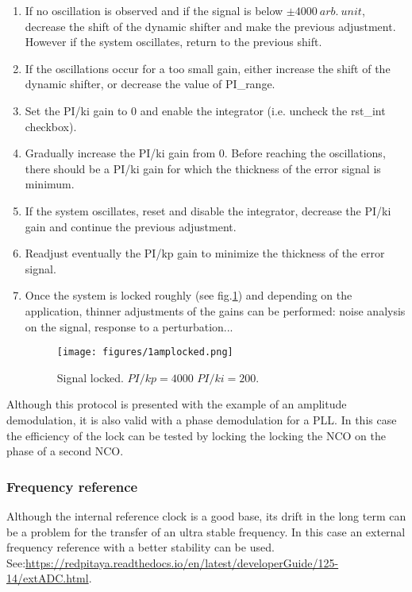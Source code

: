 \documentclass[12pt,oneside]{article}
\begin{document}
\begin{enumerate}
	\item If no oscillation is observed and if the signal is below $\pm 4000~arb.~unit$, decrease the shift of the dynamic shifter and make the previous adjustment. However if the system oscillates, return to the previous shift.
	\item If the oscillations occur for a too small gain, either increase the shift of the dynamic shifter, or decrease the value of PI\_range.
	\item Set the PI/ki gain to $0$ and enable the integrator (i.e. uncheck the rst\_int checkbox).
	\item Gradually increase the PI/ki gain from $0$. Before reaching the oscillations, there should be a PI/ki gain for which the thickness of the error signal is minimum. 
	\item If the system oscillates, reset and disable the integrator, decrease the PI/ki gain and continue the previous adjustment. 
	\item Readjust eventually the PI/kp gain to minimize the thickness of the error signal.
	\item Once the system is locked roughly (see fig.\ref{fig:3ampdemod.png}) and depending on the application, thinner adjustments of the gains can be performed: noise analysis on the signal, response to a perturbation... 
	
\begin{figure}[h!tb]
	\begin{center}
		\vspace{0.5cm}
		\texttt{[image: figures/1amplocked.png]}
		\caption{Signal locked. $PI/kp=4000$ $PI/ki=200$.}
		\label{fig:3ampdemod.png}
	\end{center}
\end{figure}
	
\end{enumerate}
\vspace{0.3cm}

Although this protocol is presented with the example of an amplitude demodulation, it is also valid with a phase demodulation for a PLL. In this case the efficiency of the lock can be tested by locking the locking the NCO on the phase of a second NCO. 

\subsubsection{Frequency reference}

Although the internal reference clock is a good base, its drift in the long term can be a problem for the transfer of an ultra stable frequency. In this case an external frequency reference with a better stability can be used. See:\newline \href{https://redpitaya.readthedocs.io/en/latest/developerGuide/125-14/extADC.html}{https://redpitaya.readthedocs.io/en/latest/developerGuide/125-14/extADC.html}.
\end{document}
